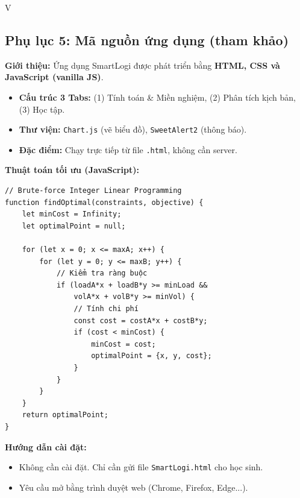 \begin{competitionsection}{V}
\subsection*{Phụ lục 5: Mã nguồn ứng dụng (tham khảo)}
\textbf{Giới thiệu:} Ứng dụng SmartLogi được phát triển bằng \textbf{HTML, CSS và JavaScript (vanilla JS)}.
\begin{itemize}[leftmargin=*,noitemsep]
\item \textbf{Cấu trúc 3 Tabs:} (1) Tính toán \& Miền nghiệm, (2) Phân tích kịch bản, (3) Học tập.
\item \textbf{Thư viện:} \texttt{Chart.js} (vẽ biểu đồ), \texttt{SweetAlert2} (thông báo).
\item \textbf{Đặc điểm:} Chạy trực tiếp từ file \texttt{.html}, không cần server.
\end{itemize}

\textbf{Thuật toán tối ưu (JavaScript):}
\begin{verbatim}
// Brute-force Integer Linear Programming
function findOptimal(constraints, objective) {
    let minCost = Infinity;
    let optimalPoint = null;
    
    for (let x = 0; x <= maxA; x++) {
        for (let y = 0; y <= maxB; y++) {
            // Kiểm tra ràng buộc
            if (loadA*x + loadB*y >= minLoad &&
                volA*x + volB*y >= minVol) {
                // Tính chi phí
                const cost = costA*x + costB*y;
                if (cost < minCost) {
                    minCost = cost;
                    optimalPoint = {x, y, cost};
                }
            }
        }
    }
    return optimalPoint;
}
\end{verbatim}

\textbf{Hướng dẫn cài đặt:}
\begin{itemize}[leftmargin=*,noitemsep]
\item Không cần cài đặt. Chỉ cần gửi file \texttt{SmartLogi.html} cho học sinh.
\item Yêu cầu mở bằng trình duyệt web (Chrome, Firefox, Edge...).
\end{itemize}
\end{competitionsection}



